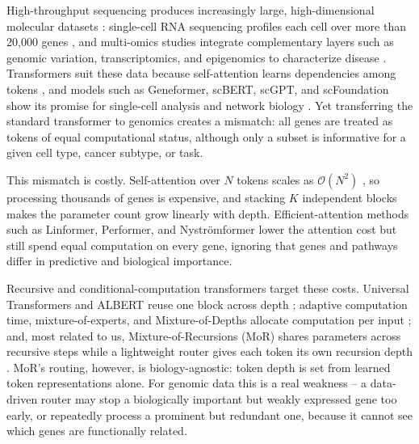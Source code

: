 \documentclass[letterpaper]{article}
\begin{document}
High-throughput sequencing produces increasingly large, high-dimensional molecular
datasets \cite{luecken2019current,hasin2017multiomics}: single-cell RNA sequencing
profiles each cell over more than 20,000 genes
\cite{luecken2019current,stuart2019integrative}, and multi-omics studies integrate
complementary layers such as genomic variation, transcriptomics, and epigenomics to
characterize disease \cite{hasin2017multiomics,stuart2019integrative}. Transformers
suit these data because self-attention learns dependencies among tokens
\cite{vaswani2017attention}, and models such as Geneformer, scBERT, scGPT, and
scFoundation show its promise for single-cell analysis and network biology
\cite{theodoris2023transfer,scbert2022,cui2024scgpt,hao2024large}. Yet transferring
the standard transformer to genomics creates a mismatch: all genes are treated as
tokens of equal computational status, although only a subset is informative for a
given cell type, cancer subtype, or task.

This mismatch is costly. Self-attention over $N$ tokens scales as $\mathcal{O}(N^2)$
\cite{vaswani2017attention}, so processing thousands of genes is expensive, and
stacking $K$ independent blocks makes the parameter count grow linearly with depth.
Efficient-attention methods such as Linformer, Performer, and Nystr\"omformer lower
the attention cost \cite{wang2020linformer,choromanski2021performer,xiong2021nystromformer}
but still spend equal computation on every gene, ignoring that genes and pathways
differ in predictive and biological importance.

Recursive and conditional-computation transformers target these costs. Universal
Transformers and ALBERT reuse one block across depth
\cite{dehghani2019universal,lan2020albert}; adaptive computation time,
mixture-of-experts, and Mixture-of-Depths allocate computation per input
\cite{graves2016act,shazeer2017moe,raposo2024mixture}; and, most related to us,
Mixture-of-Recursions (MoR) shares parameters across recursive steps while a
lightweight router gives each token its own recursion depth \cite{bae2025mixture}.
MoR's routing, however, is biology-agnostic: token depth is set from learned token
representations alone. For genomic data this is a real weakness -- a data-driven
router may stop a biologically important but weakly expressed gene too early, or
repeatedly process a prominent but redundant one, because it cannot see which genes
are functionally related.
\end{document}
